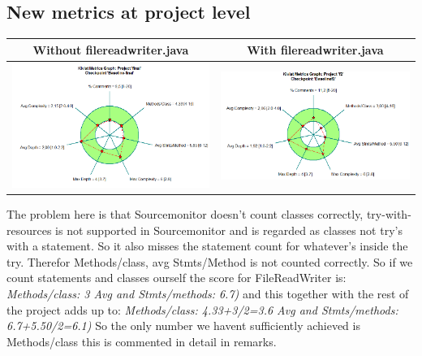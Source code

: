 \documentclass{article}
\begin{document}
\subsection{New metrics at project level} %
\hspace*{-0.5cm}
\begin{tabulary}{0.5\textwidth}{| c | c |}
 \hline
Without filereadwriter.java & With filereadwriter.java \\ \hline
\includegraphics[scale=0.4]{Project-after-with-filereadwriter.png} & \includegraphics[scale=0.4]{Kiviat-project-without-filereadwriter.png} \\ \hline
\end{tabulary}\vspace{0.2cm}

The problem here is that Sourcemonitor doesn't count classes correctly, try-with-resources is not supported in Sourcemonitor and is regarded as classes not try's with a statement. So it also misses the statement count for whatever's inside the try. Therefor Methods/class, avg Stmts/Method is not counted correctly. So if we count statements and classes ourself the score for FileReadWriter is:
\textit{Methods/class: 3 Avg and Stmts/methods: 6.7)} and this together with the rest of the project adds up to: \textit{Methods/class: 4.33+3/2=3.6 Avg and Stmts/methods: 6.7+5.50/2=6.1)}
So the only number we havent sufficiently achieved is Methods/class this is commented in detail in remarks.
\end{document}
